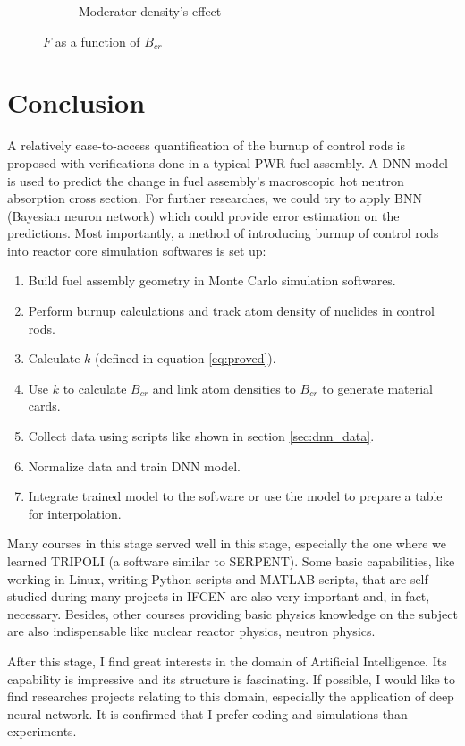 \begin{figure}[!htb]
\begin{subfigure}[b]{.475\textwidth}
        \caption{Moderator density's effect}
        \label{fig:Fdiffwd}
    \end{subfigure}
    \caption{$F$ as a function of $B_{cr}$}
    \label{fig:Fdif}
\end{figure}



\chapter{Conclusion}
A relatively ease-to-access quantification of the burnup of control rods is proposed with verifications done in a
typical PWR fuel assembly.
A DNN model is used to predict the change in fuel assembly's macroscopic hot neutron absorption cross section.
For further researches, we could try to apply BNN (Bayesian neuron network) which could provide error estimation on
the predictions.
Most importantly, a method of introducing burnup of control rods into reactor core simulation softwares is set up:
\begin{enumerate}
    \item Build fuel assembly geometry in Monte Carlo simulation softwares.
    \item Perform burnup calculations and track atom density of nuclides in control rods.
    \item Calculate $k$ (defined in equation \ref{eq:proved}).
    \item Use $k$ to calculate $B_{cr}$ and link atom densities to $B_{cr}$ to generate material cards.
    \item Collect data using scripts like shown in section \ref{sec:dnn_data}.
    \item Normalize data and train DNN model.
    \item Integrate trained model to the software or use the model to prepare a table for interpolation.
\end{enumerate}

Many courses in this stage served well in this stage, especially the one where we learned TRIPOLI (a software similar to SERPENT).
Some basic capabilities, like working in Linux, writing Python scripts and MATLAB scripts, that are self-studied
during many projects in IFCEN are also very important and, in fact, necessary.
Besides, other courses providing basic physics knowledge on the subject are also indispensable
like nuclear reactor physics, neutron physics.


After this stage, I find great interests in the domain of Artificial Intelligence.
Its capability is impressive and its structure is fascinating.
If possible, I would like to find researches projects relating to this domain, especially the application of deep neural network.
It is confirmed that I prefer coding and simulations than experiments.

